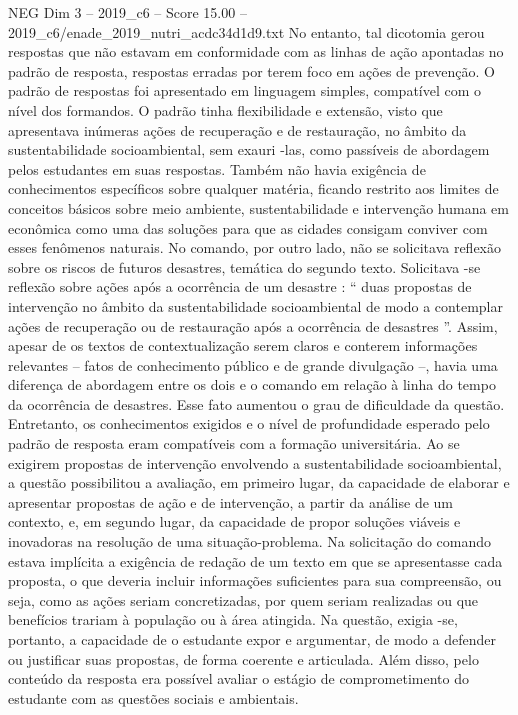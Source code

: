 \begin{textsample}{NEG Dim 3 – 2019\_c6 – Score 15.00 – 2019\_c6/enade\_2019\_nutri\_acdc34d1d9.txt}
No entanto, tal dicotomia gerou respostas que não estavam em conformidade com as linhas de ação apontadas no padrão de resposta, respostas erradas por terem foco em ações de prevenção.
O padrão de respostas foi apresentado em linguagem simples, compatível com o nível dos formandos.
O padrão tinha flexibilidade e extensão, visto que apresentava inúmeras ações de recuperação e de restauração, no âmbito da sustentabilidade socioambiental, sem exauri -las, como passíveis de abordagem pelos estudantes em suas respostas.
Também não havia exigência de conhecimentos específicos sobre qualquer matéria, ficando restrito aos limites de conceitos básicos sobre meio ambiente, sustentabilidade e intervenção humana em econômica como uma das soluções para que as cidades consigam conviver com esses fenômenos naturais.
No comando, por outro lado, não se solicitava reflexão sobre os riscos de futuros desastres, temática do segundo texto.
Solicitava -se reflexão sobre ações após a ocorrência de um desastre : “ duas propostas de intervenção no âmbito da sustentabilidade socioambiental de modo a contemplar ações de recuperação ou de restauração após a ocorrência de desastres ”.
Assim, apesar de os textos de contextualização serem claros e conterem informações relevantes – fatos de conhecimento público e de grande divulgação –, havia uma diferença de abordagem entre os dois e o comando em relação à linha do tempo da ocorrência de desastres.
Esse fato aumentou o grau de dificuldade da questão.
Entretanto, os conhecimentos exigidos e o nível de profundidade esperado pelo padrão de resposta eram compatíveis com a formação universitária.
Ao se exigirem propostas de intervenção envolvendo a sustentabilidade socioambiental, a questão possibilitou a avaliação, em primeiro lugar, da capacidade de elaborar e apresentar propostas de ação e de intervenção, a partir da análise de um contexto, e, em segundo lugar, da capacidade de propor soluções viáveis e inovadoras na resolução de uma situação-problema.
Na solicitação do comando estava implícita a exigência de redação de um texto em que se apresentasse cada proposta, o que deveria incluir informações suficientes para sua compreensão, ou seja, como as ações seriam concretizadas, por quem seriam realizadas ou que benefícios trariam à população ou à área atingida.
Na questão, exigia -se, portanto, a capacidade de o estudante expor e argumentar, de modo a defender ou justificar suas propostas, de forma coerente e articulada.
Além disso, pelo conteúdo da resposta era possível avaliar o estágio de comprometimento do estudante com as questões sociais e ambientais.

\end{textsample}
